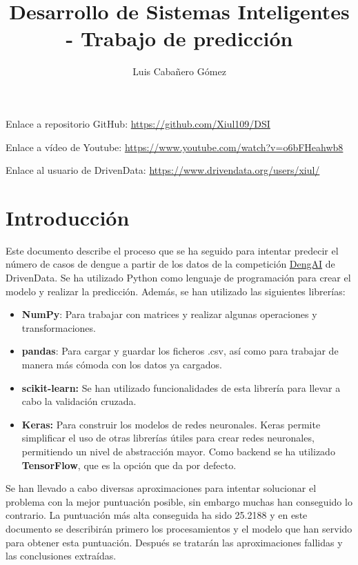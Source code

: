 \documentclass[acmtog, screen]{acmart}
\begin{document}
\title{Desarrollo de Sistemas Inteligentes - Trabajo de predicción}

\author{Luis Cabañero Gómez}

\maketitle

Enlace a repositorio GitHub: \url{https://github.com/Xiul109/DSI}

Enlace a vídeo de Youtube: \url{https://www.youtube.com/watch?v=o6bFHeahwb8}

Enlace al usuario de DrivenData: \url{https://www.drivendata.org/users/xiul/}

\section{Introducción}
Este documento describe el proceso que se ha seguido para intentar predecir el número de casos de dengue a partir de los datos de la competición \href{https://www.drivendata.org/competitions/44/dengai-predicting-disease-spread/page/80/}{DengAI} de DrivenData. Se ha utilizado Python como lenguaje de programación para crear el modelo y realizar la predicción. Además, se han utilizado las siguientes librerías:
\begin{itemize}
	\item \textbf{NumPy}: Para trabajar con matrices y realizar algunas operaciones y transformaciones.
	\item \textbf{pandas}: Para cargar y guardar los ficheros .csv, así como para trabajar de manera más cómoda con los datos ya cargados.
	\item \textbf{scikit-learn:} Se han utilizado funcionalidades de esta librería para llevar a cabo la validación cruzada.
	\item \textbf{Keras:} Para construir los modelos de redes neuronales. Keras permite simplificar el uso de otras librerías útiles para crear redes neuronales, permitiendo un nivel de abstracción mayor. Como backend se ha utilizado \textbf{TensorFlow}, que es la opción que da por defecto.
\end{itemize}

Se han llevado a cabo diversas aproximaciones para intentar solucionar el problema con la mejor puntuación posible, sin embargo muchas han conseguido lo contrario. La puntuación más alta conseguida ha sido 25.2188  y en este documento se describirán primero los procesamientos y el modelo que han servido para obtener esta puntuación. Después se tratarán las aproximaciones fallidas y las conclusiones extraídas.
\end{document}

